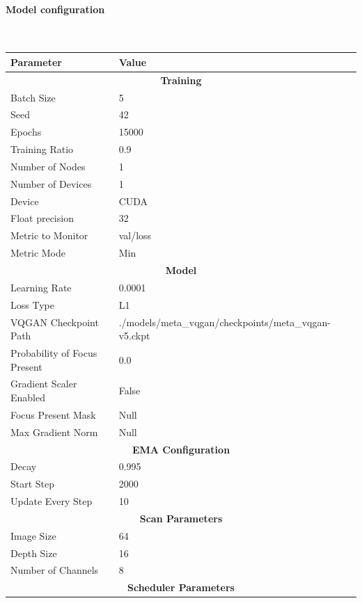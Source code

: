 \paragraph{Model configuration}\mbox{}\\

\begin{table}[H]
\centering
\begin{tabular}{|l|l|}
\hline
\textbf{Parameter} & \textbf{Value} \\
\hline
\multicolumn{2}{|c|}{\textbf{Training}} \\
\hline
Batch Size & 5 \\
\hline
Seed & 42 \\
\hline
Epochs & 15000 \\
\hline
Training Ratio & 0.9 \\
\hline
Number of Nodes & 1 \\
\hline
Number of Devices & 1 \\
\hline
Device & CUDA \\
\hline
Float precision & 32 \\
\hline
Metric to Monitor & val/loss \\
\hline
Metric Mode & Min \\
\hline
\multicolumn{2}{|c|}{\textbf{Model}} \\
\hline
Learning Rate & 0.0001 \\
\hline
Loss Type & L1 \\
\hline
VQGAN Checkpoint Path & ./models/meta_vqgan/checkpoints/meta_vqgan-v5.ckpt \\
\hline
Probability of Focus Present & 0.0 \\
\hline
Gradient Scaler Enabled & False \\
\hline
Focus Present Mask & Null \\
\hline
Max Gradient Norm & Null \\
\hline
\multicolumn{2}{|c|}{\textbf{EMA Configuration}} \\
\hline
Decay & 0.995 \\
\hline
Start Step & 2000 \\
\hline
Update Every Step & 10 \\
\hline
\multicolumn{2}{|c|}{\textbf{Scan Parameters}} \\
\hline
Image Size & 64 \\
\hline
Depth Size & 16 \\
\hline
Number of Channels & 8 \\
\hline
\multicolumn{2}{|c|}{\textbf{Scheduler Parameters}} \\

\end{tabular}
\end{table}
